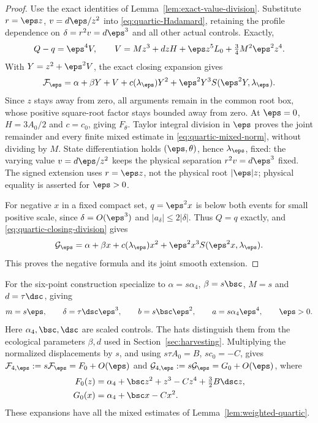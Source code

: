 \begin{proof}
Use the exact identities of Lemma~\ref{lem:exact-value-division}.
Substitute \(r=\eps z\), \(v=d\eps/z^2\) into
\eqref{eq:quartic-Hadamard}, retaining the profile dependence on
\(\delta=r^2v=d\eps^3\) and all other actual controls. Exactly,
\[
 Q-q=\eps^4V,\qquad
 V=Mz^3+dzH+\eps z^5L_0+\tfrac34M^2\eps^2z^4.
\]
With \(Y=z^2+\eps^2V\), the exact closing expansion gives
\begin{equation}\label{eq:quartic-exact-residual}
 \mathcal F_\eps=
 \alpha+\beta Y+V+c(\lambda_\eps)Y^2
                   +\eps^2Y^3S(\eps^2Y,\lambda_\eps).
\end{equation}
Since \(z\) stays away from zero, all arguments remain in the common
root box, whose positive square-root factor stays bounded away from zero.
At \(\eps=0\), \(H=3A_0/2\) and \(c=c_0\), giving \(F_\theta\).
Taylor integral division in \(\eps\) proves the joint remainder and
every finite mixed estimate in \eqref{eq:quartic-mixed-norm}, without
dividing by \(M\). State differentiation holds \((\eps,\theta)\), hence
\(\lambda_\eps\), fixed: the varying value \(v=d\eps/z^2\) keeps
the physical separation \(r^2v=d\eps^3\) fixed.
The signed extension uses \(r=\eps z\), not the physical
root \(|\eps|z\); physical equality is asserted for \(\eps>0\).

For negative \(x\) in a fixed compact set, \(q=\eps^2x\) is below
both events for small positive scale, since \(\delta=O(\eps^3)\) and
\(|a_\delta|\le2|\delta|\). Thus \(Q=q\) exactly, and
\eqref{eq:quartic-closing-division} gives
\[
 \mathcal G_\eps=\alpha+\beta x+c(\lambda_\eps)x^2
                   +\eps^2x^3S(\eps^2x,\lambda_\eps).
\]
This proves the negative formula and its joint smooth extension.
\end{proof}

For the six-point construction specialize to
\(\alpha=s\alpha_4\), \(\beta=s\bsc\), \(M=s\) and
\(d=\tau\dsc\), giving
\begin{equation}\label{eq:quartic-weights}
 m=s\eps,\qquad \delta=\tau \dsc\eps^3,\qquad
 b=s\bsc\eps^2,\qquad a=s\alpha_4\eps^4,\qquad \eps>0.
\end{equation}
Here \(\alpha_4,\bsc,\dsc\) are scaled controls. The hats distinguish them from the
ecological parameters $\beta,d$ used in Section~\ref{sec:harvesting}.
Multiplying the normalized displacements by \(s\), and using
\(s\tau A_0=B\), \(sc_0=-C\), gives
\(\mathcal F_{4,\eps}:=s\mathcal F_\eps=F_0+O(\eps)\) and
\(\mathcal G_{4,\eps}:=s\mathcal G_\eps=G_0+O(\eps)\), where
\[
 \begin{aligned}
 F_0(z)&=\alpha_4+\bsc z^2+z^3-Cz^4+\tfrac32B\dsc z,\\
 G_0(x)&=\alpha_4+\bsc x-Cx^2.
 \end{aligned}
\]
These expansions have all the mixed estimates of
Lemma~\ref{lem:weighted-quartic}.

